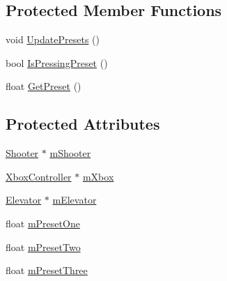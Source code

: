 \subsection*{\-Protected \-Member \-Functions}
\begin{DoxyCompactItemize}
\item 
void \hyperlink{class_shooter_xbox_controller_a6102fb32d6ec8c8c72aa27fdfcd77e40}{\-Update\-Presets} ()
\item 
bool \hyperlink{class_shooter_xbox_controller_acefee8e6d8ad13fe0c6b73734918668d}{\-Is\-Pressing\-Preset} ()
\item 
float \hyperlink{class_shooter_xbox_controller_a4446851f5f7ca433950bf0f5adbdba5b}{\-Get\-Preset} ()
\end{DoxyCompactItemize}
\subsection*{\-Protected \-Attributes}
\begin{DoxyCompactItemize}
\item 
\hyperlink{class_shooter}{\-Shooter} $\ast$ \hyperlink{class_shooter_xbox_controller_a05f295c56c7c95ec80a475548d3d63d0}{m\-Shooter}
\item 
\hyperlink{class_xbox_controller}{\-Xbox\-Controller} $\ast$ \hyperlink{class_shooter_xbox_controller_ac6a3e04c9fd8cbefa00817da2b40720d}{m\-Xbox}
\item 
\hyperlink{class_elevator}{\-Elevator} $\ast$ \hyperlink{class_shooter_xbox_controller_a31e92e52c378e7c6dbdde2ae3aa1fa37}{m\-Elevator}
\item 
float \hyperlink{class_shooter_xbox_controller_a000d88c13c217feeaef253327dec2575}{m\-Preset\-One}
\item 
float \hyperlink{class_shooter_xbox_controller_a82dd1a1f89edc7126e756bda865ea592}{m\-Preset\-Two}
\item 
float \hyperlink{class_shooter_xbox_controller_aae27d70782bfa97482ea93aa6193dfed}{m\-Preset\-Three}
\end{DoxyCompactItemize}


